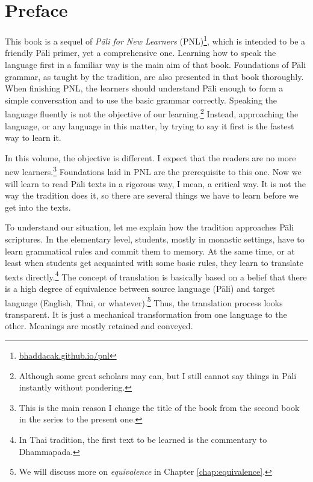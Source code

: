 \cleardoublepage
{}
{}
\chapter*{Preface}

This book is a sequel of \emph{P\=ali for New Learners} (PNL)\footnote{\url{bhaddacak.github.io/pnl}}, which is intended to be a friendly P\=ali primer, yet a comprehensive one. Learning how to speak the language first in a familiar way is the main aim of that book. Foundations of P\=ali grammar, as taught by the tradition, are also presented in that book thoroughly. When finishing PNL, the learners should understand P\=ali enough to form a simple conversation and to use the basic grammar correctly. Speaking the language fluently is not the objective of our learning.\footnote{Although some great scholars may can, but I still cannot say things in P\=ali instantly without pondering.} Instead, approaching the language, or any language in this matter, by trying to say it first is the fastest way to learn it.

In this volume, the objective is different. I expect that the readers are no more new learners.\footnote{This is the main reason I change the title of the book from the second book in the series to the present one.} Foundations laid in PNL are the prerequisite to this one. Now we will learn to read P\=ali texts in a rigorous way, I mean, a critical way. It is not the way the tradition does it, so there are several things we have to learn before we get into the texts.

To understand our situation, let me explain how the tradition approaches P\=ali scriptures. In the elementary level, students, mostly in monastic settings, have to learn grammatical rules and commit them to memory. At the same time, or at least when students get acquainted with some basic rules, they learn to translate texts directly.\footnote{In Thai tradition, the first text to be learned is the commentary to Dhammapada.} The concept of translation is basically based on a belief that there is a high degree of equivalence between source language (P\=ali) and target language (English, Thai, or whatever).\footnote{We will discuss more on \emph{equivalence} in Chapter \ref{chap:equivalence}.} Thus, the translation process looks transparent. It is just a mechanical transformation from one language to the other. Meanings are mostly retained and conveyed.

